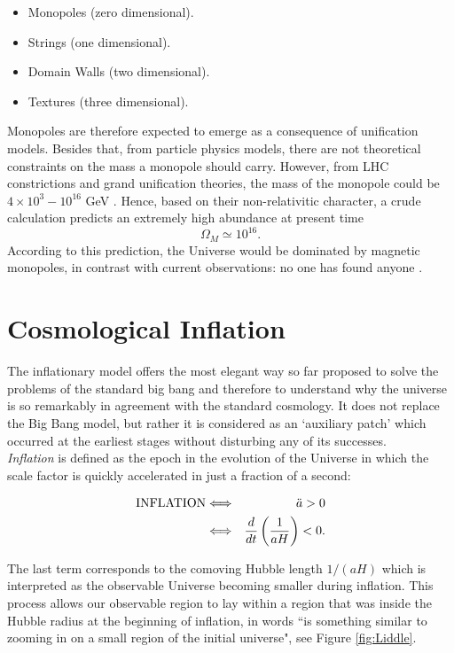 \documentclass{rmaa}
\def\bea{\begin{eqnarray}}
\def\eea{\end{eqnarray}}
\begin{document}
\begin{itemize}
\item Monopoles (zero dimensional).
\item Strings (one dimensional).
\item Domain Walls (two dimensional).
\item Textures (three dimensional).
\end{itemize}

\noindent
Monopoles are therefore expected to emerge as a consequence of unification models. 
Besides that, from particle physics models, there are not theoretical constraints on the mass a monopole should carry. However, from LHC constrictions and grand unification theories, the mass of the monopole could be $4\times 10^3-10^{16}$ GeV \citep{monopole}. Hence, based on their non-relativitic character, 
a crude calculation predicts an extremely high abundance at present time \citep{Coles}
$$
\Omega_M \simeq 10^{16}.
$$
%
According to this prediction, the Universe would be dominated by magnetic monopoles,
in contrast with current observations: no one has found anyone \citep{Ambrosio02}. 
\\


\section{Cosmological Inflation}
\vskip 6pt

The inflationary model offers the most elegant way so far proposed to solve the problems
of the standard big bang and therefore to understand why the universe is so remarkably in agreement 
with the standard cosmology. It does not replace the Big Bang model, but rather it is considered 
as an `auxiliary patch' which occurred at the earliest stages without disturbing any of its successes.
\\

\textit{Inflation} is defined as the epoch in the evolution of the Universe in which the scale factor 
is quickly accelerated in just a fraction of a second:

\bea \label{eq:inflation}
{\rm INFLATION} &\Longleftrightarrow&~~\ddot a>0 \\
&\Longleftrightarrow& \frac{d}{dt}\left( \frac{{1}}{aH}\right)<0. \label{eq:inflation2}
\eea

\noindent
The last term corresponds to the comoving Hubble length 
$1/(aH)$ which is interpreted as the observable 
Universe becoming smaller during inflation. This process allows our observable
region to lay within a region that was inside the Hubble radius at the beginning of inflation, 
in \citet{Liddle2} words ``is something
similar to zooming in on a small region of the initial universe", see
Figure \ref{fig:Liddle}.
\\
\end{document}
